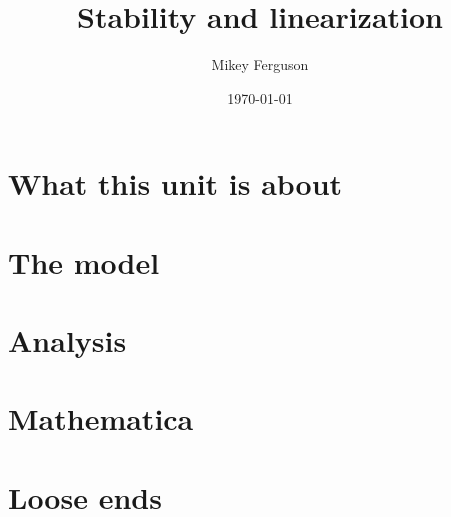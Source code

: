 \documentclass[11pt]{article}
\title{Stability and linearization}
\author{Mikey Ferguson}
\date{\today}
\begin{document}
\maketitle
\tableofcontents
\bigskip

\section{What this unit is about}

\section{The model}

\section{Analysis}

\section{Mathematica}

\section{Loose ends}
\end{document}
